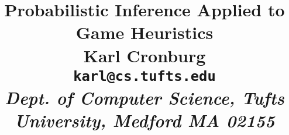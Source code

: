 \documentclass[pldi]{sigplanconf-pldi15}
\begin{document}
\title{Probabilistic Inference Applied to Game Heuristics\\
  \null
  {\small \textnormal{
    Karl Cronburg\\
    \texttt{karl@cs.tufts.edu}\\
    \emph{Dept. of Computer Science, Tufts University, Medford MA 02155}\\
  }}
}

\maketitle
\begin{abstract}
\end{abstract}



%
%

%
\end{document}
